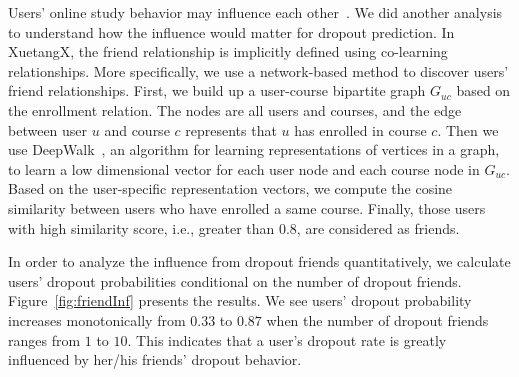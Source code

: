 	Users' online study behavior may influence each other~\cite{Qiu:2016:MPL:2835776.2835842}. We did another analysis to understand how the influence would matter for dropout prediction.
    In XuetangX, the friend relationship is implicitly defined using co-learning relationships. 
    More specifically, 
    we use a network-based method to discover users' friend relationships. First, we build up a user-course bipartite graph $G_{uc} $ based on the enrollment relation.
	 The nodes are all users and courses, and the edge between user $u$ and course $c$ represents that $u$ has enrolled in course $c$. Then we use DeepWalk~\cite{Perozzi:2014:DOL:2623330.2623732}, an algorithm for learning representations of vertices in a graph, to learn a low dimensional vector for each user node and each course node in $G_{uc}$. Based on the user-specific representation vectors, we  compute the cosine similarity between  users who have enrolled a same course. Finally, those users with high similarity score, i.e., greater than 0.8, are considered as friends. 

In order to analyze the influence from dropout friends quantitatively, we calculate users' dropout probabilities conditional on the number of dropout friends.
Figure~\ref{fig:friendInf} presents the results. We see users' dropout probability increases monotonically from $0.33$ to $0.87$ when the number of dropout friends ranges from $1$ to $10$. This  indicates that a user's dropout rate is greatly influenced by her/his friends' dropout behavior.
	 
	